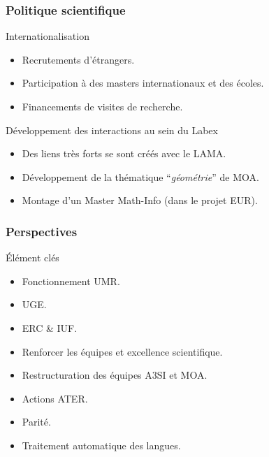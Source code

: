 \documentclass[]{beamer}
\begin{document}

\begin{frame}
  \frametitle{Politique scientifique}

  \begin{block}{Internationalisation}
    \begin{itemize}
      \item Recrutements d'étrangers.
      \item Participation à des masters internationaux et des écoles.
      \item Financements de visites de recherche.
    \end{itemize}
  \end{block}

  \begin{block}{Développement des interactions au sein du Labex}
    \begin{itemize}
      \item Des liens très forts se sont créés avec le LAMA.
      \item Développement de la thématique ``\emph{géométrie}'' de MOA.
      \item Montage d'un Master Math-Info (dans le projet EUR).
    \end{itemize}
  \end{block}

\end{frame}


\begin{frame}
  \frametitle{Perspectives}

  \begin{block}{\'Elément clés}
    \begin{itemize}
      \item Fonctionnement UMR.
      \item UGE.
      \item ERC \& IUF.
      \item Renforcer les équipes et excellence scientifique.
      \item Restructuration des équipes A3SI et MOA.
      \item Actions ATER.
      \item Parité.
      \item Traitement automatique des langues.
    \end{itemize}
  \end{block}

\end{frame}
\end{document}
